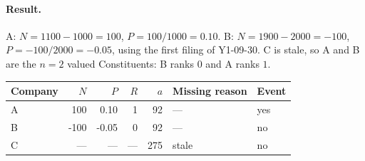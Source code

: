 \documentclass[11pt]{article}
\newcommand{\exresult}[7]{#1 & #2 & #3 & #4 & #5 & #6 & #7 \\}
\begin{document}
\paragraph{Result.} A: $N = 1100 - 1000 = 100$, $P = 100 / 1000 = 0.10$.
B: $N = 1900 - 2000 = -100$, $P = -100 / 2000 = -0.05$, using the first filing of Y1-09-30.
C is stale, so A and B are the $n = 2$ valued Constituents: B ranks $0$ and A ranks $1$.

\begin{center}
\begin{tabular}{l r r r r l l}
\toprule
Company & $N$ & $P$ & $R$ & $a$ & Missing reason & Event \\
\midrule
\exresult{A}{100}{0.10}{1}{92}{---}{yes}
\exresult{B}{-100}{-0.05}{0}{92}{---}{no}
\exresult{C}{---}{---}{---}{275}{stale}{no}
\bottomrule
\end{tabular}
\end{center}
\end{document}
